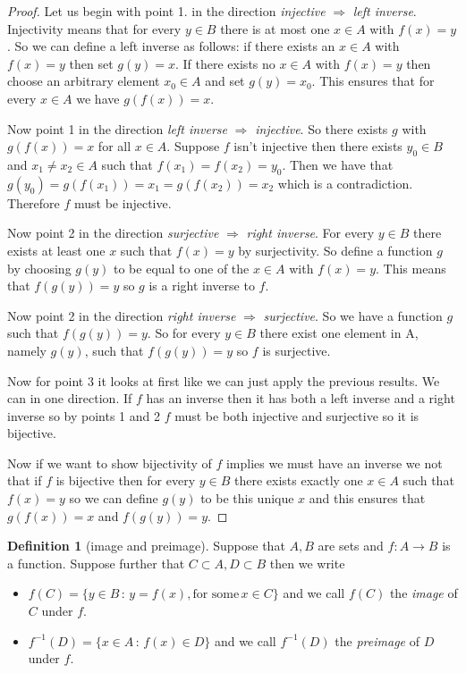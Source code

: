 \documentclass[
]{book}
\theoremstyle{definition}
\newtheorem{definition}{Definition}[chapter]
\theoremstyle{definition}
\theoremstyle{definition}
\theoremstyle{definition}
\theoremstyle{remark}
\begin{document}
\begin{proof}
Let us begin with point 1. in the direction \emph{injective} \(\Rightarrow\) \emph{left inverse}. Injectivity means that for every \(y \in B\) there is at most one \(x \in A\) with \(f(x) = y\). So we can define a left inverse as follows: if there exists an \(x \in A\) with \(f(x)=y\) then set \(g(y) =x\). If there exists no \(x \in A\) with \(f(x)=y\) then choose an arbitrary element \(x_0 \in A\) and set \(g(y) = x_0\). This ensures that for every \(x \in A\) we have \(g(f(x))= x\).

Now point 1 in the direction \emph{left inverse} \(\Rightarrow\) \emph{injective}. So there exists \(g\) with \(g(f(x))=x\) for all \(x \in A\). Suppose \(f\) isn't injective then there exists \(y_0 \in B\) and \(x_1 \neq x_2 \in A\) such that \(f(x_1) = f(x_2) = y_0\). Then we have that \(g(y_0) = g(f(x_1))= x_1 = g(f(x_2))=x_2\) which is a contradiction. Therefore \(f\) must be injective.

Now point 2 in the direction \emph{surjective} \(\Rightarrow\) \emph{right inverse}. For every \(y \in B\) there exists at least one \(x\) such that \(f(x)=y\) by surjectivity. So define a function \(g\) by choosing \(g(y)\) to be equal to one of the \(x \in A\) with \(f(x) = y\). This means that \(f(g(y))= y\) so \(g\) is a right inverse to \(f\).

Now point 2 in the direction \emph{right inverse} \(\Rightarrow\) \emph{surjective}. So we have a function \(g\) such that \(f(g(y))=y\). So for every \(y \in B\) there exist one element in A, namely \(g(y)\), such that \(f(g(y))=y\) so \(f\) is surjective.

Now for point 3 it looks at first like we can just apply the previous results. We can in one direction. If \(f\) has an inverse then it has both a left inverse and a right inverse so by points 1 and 2 \(f\) must be both injective and surjective so it is bijective.

Now if we want to show bijectivity of \(f\) implies we must have an inverse we not that if \(f\) is bijective then for every \(y\in B\) there exists exactly one \(x \in A\) such that \(f(x) = y\) so we can define \(g(y)\) to be this unique \(x\) and this ensures that \(g(f(x))= x\) and \(f(g(y))= y\).
\end{proof}

\begin{definition}[image and preimage]

Suppose that \(A, B\) are sets and \(f: A \rightarrow B\) is a function. Suppose further that \(C \subset A, D \subset B\) then we write

\begin{itemize}
\item
  \(f(C)= \{y \in B \,:\, y=f(x), \mbox{for some} \, x \in C\}\) and we call \(f(C)\) the \emph{image} of \(C\) under \(f\).
\item
  \(f^{-1}(D)= \{ x \in A \,:\, f(x) \in D\}\) and we call \(f^{-1}(D)\) the \emph{preimage} of \(D\) under \(f\).
\end{itemize}

\end{definition}
\end{document}
